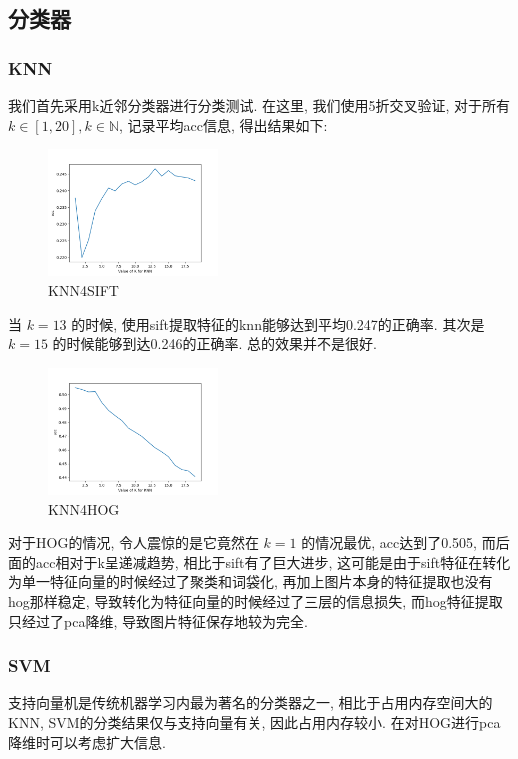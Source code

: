 \documentclass[lang=cn,12pt,a4paper]{elegantpaper}
\begin{document}
\subsection{分类器}
\subsubsection{KNN}
我们首先采用k近邻分类器进行分类测试. 在这里, 我们使用5折交叉验证, 对于所有 $k \in [1, 20], k \in \mathbb{N}$, 记录平均acc信息, 得出结果如下:
\begin{figure}[h]
    \centering
    \includegraphics[width=0.4\textwidth]{lateximgs/knn1.png}
    \caption{KNN4SIFT}
\end{figure}

当 $k=13$ 的时候, 使用sift提取特征的knn能够达到平均0.247的正确率. 其次是 $k=15$ 的时候能够到达0.246的正确率. 总的效果并不是很好.
\begin{figure}[h]
    \centering
    \includegraphics[width=0.4\textwidth]{lateximgs/knn2.png}
    \caption{KNN4HOG}
\end{figure}

对于HOG的情况, 令人震惊的是它竟然在 $k=1$ 的情况最优, acc达到了0.505, 而后面的acc相对于k呈递减趋势, 相比于sift有了巨大进步, 这可能是由于sift特征在转化为单一特征向量的时候经过了聚类和词袋化, 再加上图片本身的特征提取也没有hog那样稳定, 导致转化为特征向量的时候经过了三层的信息损失, 而hog特征提取只经过了pca降维, 导致图片特征保存地较为完全.

\subsubsection{SVM}
支持向量机是传统机器学习内最为著名的分类器之一, 相比于占用内存空间大的KNN, SVM的分类结果仅与支持向量有关, 因此占用内存较小. 在对HOG进行pca降维时可以考虑扩大信息.
\end{document}
